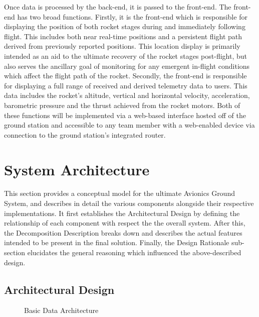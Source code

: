 \documentclass[journal,10pt,onecolumn,compsoc]{IEEEtran}
\begin{document}
	\noindent Once data is processed by the back-end, it is passed to the front-end.
	The front-end has two broad functions.
	Firstly, it is the front-end which is responsible for displaying the position of both rocket stages during and immediately following flight.
	This includes both near real-time positions and a persistent flight path derived from previously reported positions.
	This location display is primarily intended as an aid to the ultimate recovery of the rocket stages post-flight, but also serves the ancillary goal of monitoring for any emergent in-flight conditions which affect the flight path of the rocket.
	Secondly, the front-end is responsible for displaying a full range of received and derived telemetry data to users.
	This data includes the rocket’s altitude, vertical and horizontal velocity, acceleration, barometric pressure and the thrust achieved from the rocket motors.
	Both of these functions will be implemented via a web-based interface hosted off of the ground station and accessible to any team member with a web-enabled device via connection to the ground station's integrated router. 

	

\section{System Architecture}
	\noindent This section provides a conceptual model for the ultimate Avionics Ground System, and describes in detail the various components alongside their respective implementations.
	It first establishes the Architectural Design by defining the relationship of each component with respect the the overall system.
	After this, the Decomposition Description breaks down and describes the actual features intended to be present in the final solution.
	Finally, the Design Rationale sub-section elucidates the general reasoning which influenced the above-described design.

	\subsection{Architectural Design}

		\begin{figure}[H]
		\caption{Basic Data Architecture}
		\end{figure}
\end{document}
